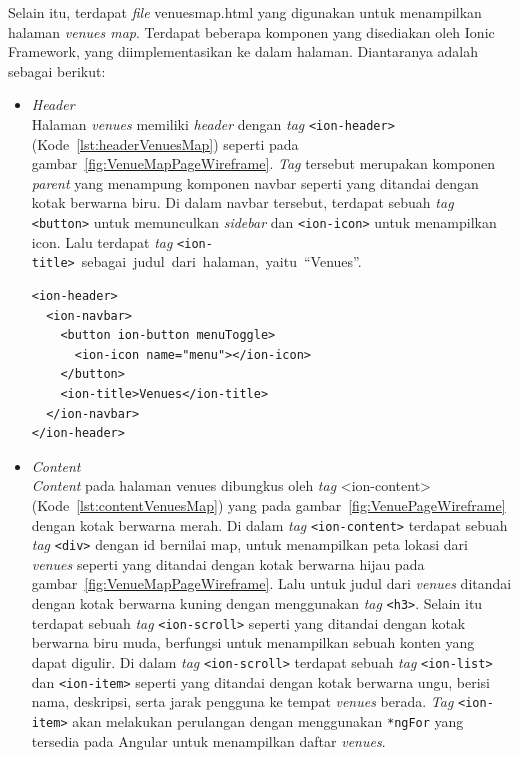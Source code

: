 \begin{enumerate}
	Selain itu, terdapat \textit{file} venues\textunderscore map.html yang digunakan untuk menampilkan halaman \textit{venues map}. Terdapat beberapa komponen yang disediakan oleh Ionic Framework, yang diimplementasikan ke dalam halaman. Diantaranya adalah sebagai berikut:
\newpage
	\begin{itemize}
		\item \textit{Header} \\
		 Halaman \textit{venues} memiliki \textit{header} dengan \textit{tag} \texttt{<ion-header>} (Kode~\ref{lst:headerVenuesMap}) seperti pada gambar~\ref{fig:VenueMapPageWireframe}. \textit{Tag} tersebut merupakan komponen \textit{parent} yang menampung komponen navbar seperti yang ditandai dengan kotak berwarna biru. Di dalam navbar tersebut, terdapat sebuah \textit{tag} \texttt{<button>} untuk memunculkan \textit{sidebar} dan \texttt{<ion-icon>} untuk menampilkan icon. Lalu terdapat \textit{tag} \texttt{<ion-title>}~sebagai~judul~dari~halaman,~yaitu~``Venues''.
		
\begin{lstlisting}[label={lst:headerVenuesMap}, caption=\textit{Header} pada venues\textunderscore map.html]
<ion-header>
  <ion-navbar>
    <button ion-button menuToggle>
      <ion-icon name="menu"></ion-icon>
    </button>
    <ion-title>Venues</ion-title>
  </ion-navbar>
</ion-header>
\end{lstlisting}

		\item \textit{Content} \\
		\textit{Content} pada halaman venues dibungkus oleh \textit{tag} <ion-content> (Kode~\ref{lst:contentVenuesMap}) yang pada gambar~\ref{fig:VenuePageWireframe} dengan kotak berwarna merah. Di dalam \textit{tag} \texttt{<ion-content>} terdapat sebuah \textit{tag} \texttt{<div>} dengan id bernilai map, untuk menampilkan peta lokasi dari \textit{venues} seperti yang ditandai dengan kotak berwarna hijau pada gambar~\ref{fig:VenueMapPageWireframe}. Lalu untuk judul dari \textit{venues} ditandai dengan kotak berwarna kuning dengan menggunakan \textit{tag} \texttt{<h3>}. Selain itu terdapat sebuah \textit{tag} \texttt{<ion-scroll>} seperti yang ditandai dengan kotak berwarna biru muda, berfungsi untuk menampilkan sebuah konten yang dapat digulir. Di dalam \textit{tag} \texttt{<ion-scroll>} terdapat sebuah \textit{tag} \texttt{<ion-list>} dan \texttt{<ion-item>} seperti yang ditandai dengan kotak berwarna ungu, berisi nama, deskripsi, serta jarak pengguna ke tempat \textit{venues} berada. \textit{Tag} \texttt{<ion-item>} akan melakukan perulangan dengan menggunakan \texttt{*ngFor} yang tersedia pada Angular untuk menampilkan daftar \textit{venues}.
		

\end{itemize}
\end{enumerate}
